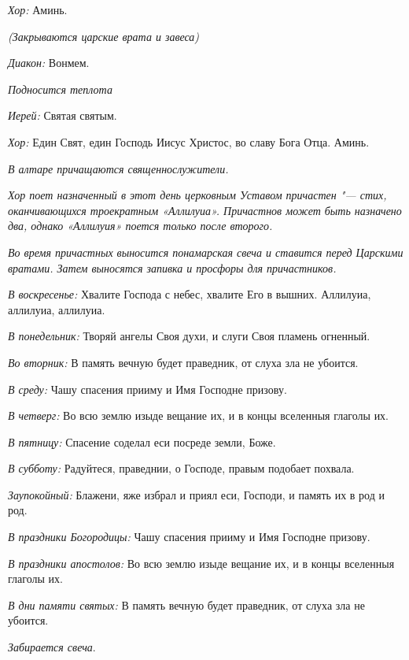\begin{mymulticols}
{\itshape Хор:} Аминь.

{\itshape (Закрываются царские врата и завеса)}

{\itshape Диакон:} Вонмем. 

{\itshape Подносится теплота}

{\itshape Иерей:} Святая святым. 

{\itshape Хор:} Един Свят, един Господь Иисус Христос, во славу Бога Отца. Аминь. 


{\itshape В алтаре причащаются священнослужители. }

{\itshape Хор поет назначенный в этот день церковным Уставом причастен "--- стих, оканчивающихся троекратным «Аллилуиа». Причастнов может быть назначено два, однако «Аллилуия» поется только после второго.}


{\itshape Во время причастных выносится понамарская свеча и ставится перед Царскими вратами. Затем выносятся запивка и просфоры для причастников.}

{\itshape В воскресенье:} Хвалите Господа с небес, хвалите Его в вышних. Аллилуиа, аллилуиа, аллилуиа. 

{\itshape В понедельник:} Творяй ангелы Своя духи, и слуги Своя пламень огненный. 

{\itshape Во вторник:} В память вечную будет праведник, от слуха зла не убоится. 

{\itshape В среду:} Чашу спасения прииму и Имя Господне призову. 

{\itshape В четверг:} Во всю землю изыде вещание их, и в концы вселенныя глаголы их. 

{\itshape В пятницу:} Спасение соделал еси посреде земли, Боже. 

{\itshape В субботу:} Радуйтеся, праведнии, о Господе, правым подобает похвала. 

{\itshape Заупокойный:} Блажени, яже избрал и приял еси, Господи, и память их в род и род. 

{\itshape В праздники Богородицы:} Чашу спасения прииму и Имя Господне призову. 

{\itshape В праздники апостолов:} Во всю землю изыде вещание их, и в концы вселенныя глаголы их. 

{\itshape В дни памяти святых:} В память вечную будет праведник, от слуха зла не убоится. 

{\itshape  Забирается свеча}.


\end{mymulticols}
